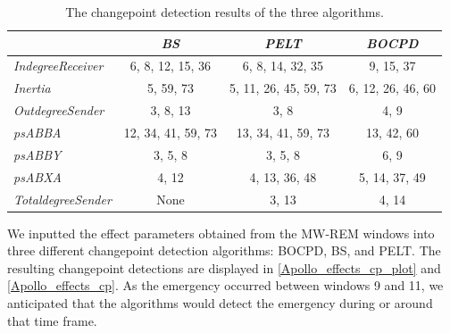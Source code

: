 \documentclass[]{interact}
\theoremstyle{plain}%
\theoremstyle{definition}
\theoremstyle{remark}
\begin{document}
    \begin{table}[H]
    	\centering
    	\renewcommand{\arraystretch}{1.2} %
    	\small
    	\caption{The changepoint detection results of the three algorithms.}
    	\begin{tabular}{lccc}
    		\hline
    		& \textit{BS}        & \textit{PELT}         & \textit{BOCPD}                   \\ \hline
    		\textit{IndegreeReceiver}  & 6, 8, 12, 15, 36   & 6, 8, 14, 32, 35      & {\color[HTML]{000000} 9, 15, 37} \\
    		\textit{Inertia}           & 5, 59, 73          & 5, 11, 26, 45, 59, 73 & 6, 12, 26, 46, 60                \\
    		\textit{OutdegreeSender}   & 3, 8, 13           & 3, 8                  & 4, 9                             \\
    		\textit{psABBA}            & 12, 34, 41, 59, 73 & 13, 34, 41, 59, 73    & 13, 42, 60                       \\
    		\textit{psABBY}            & 3, 5, 8            & 3, 5, 8               & 6, 9                             \\
    		\textit{psABXA}            & 4, 12              & 4, 13, 36, 48         & 5, 14, 37, 49                    \\
    		\textit{TotaldegreeSender} & None               & 3, 13                 & 4, 14                            \\ \hline
    	\end{tabular}
    	\label{Apollo_effects_cp}
    \end{table}
	
	We inputted the effect parameters obtained from the MW-REM windows into three different changepoint detection algorithms: BOCPD, BS, and PELT. The resulting changepoint detections are displayed in \autoref{Apollo_effects_cp_plot} and \autoref{Apollo_effects_cp}. As the emergency occurred between windows 9 and 11, we anticipated that the algorithms would detect the emergency during or around that time frame. \\
	
\end{document}

